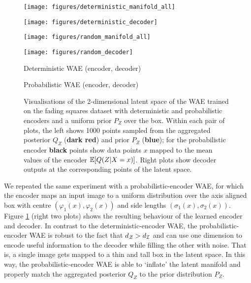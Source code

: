 \begin{figure*}[t]
	\centering
	\begin{minipage}{.25\textwidth}
		\centering
		\texttt{[image: figures/deterministic\_manifold\_all]}

		
	\end{minipage}%
	\begin{minipage}{.25\textwidth}
		\centering
		\texttt{[image: figures/deterministic\_decoder]}		

		
	\end{minipage}%
	\begin{minipage}{.25\textwidth}
		\centering
		\texttt{[image: figures/random\_manifold\_all]}	

		
	\end{minipage}%
	\begin{minipage}{.25\textwidth}
	\centering

		\texttt{[image: figures/random\_decoder]}	

\end{minipage}
	\begin{minipage}{.5\textwidth}
	\centering
	Deterministic WAE (encoder, decoder)
\end{minipage}%
	\begin{minipage}{.5\textwidth}
	\centering
	Probabilistic WAE (encoder, decoder)
\end{minipage}%
\setlength{\belowcaptionskip}{-10pt}
	\caption{\label{fig:fading-squares-latent}
		Visualisations of the 2-dimensional latent space of the WAE trained on the fading squares dataset with deterministic and probabilistic encoders and a uniform prior $P_Z$ over the box. Within each pair of plots, the left shows 1000 points sampled from the aggregated posterior $Q_Z$ ({\bf dark red}) and prior $P_Z$ ({\bf blue}); for the probabilistic encoder {\bf black} points show data points $x$ mapped to the mean values of the encoder $\mathbb{E}[Q(Z|X=x)]$.
		Right plots show decoder outputs at the corresponding points of the latent space.}
\end{figure*}


We repeated the same experiment with a probabilistic-encoder WAE, for which the encoder maps an input image to a uniform distribution over the axis aligned box with centre $(\varphi_{1}(x),  \varphi_{2}(x))$ and side lengths $(\sigma_{1}(x), \sigma_{2}(x))$. 
Figure \ref{fig:fading-squares-latent} (right two plots) shows the resulting behaviour of the learned encoder and decoder. In contrast to the deterministic-encoder WAE, the probabilistic-encoder WAE is robust to the fact that $d_{\mathcal{Z}} > d_{\mathcal{I}}$ and can use one dimension to encode useful information to the decoder while filling the other with noise. That is, a single image gets mapped to a thin and tall box in the latent space. In this way, the probabilistic-encoder WAE is able to `inflate' the latent manifold and properly match the aggregated posterior $Q_Z$ to the prior distribution $P_Z$.

